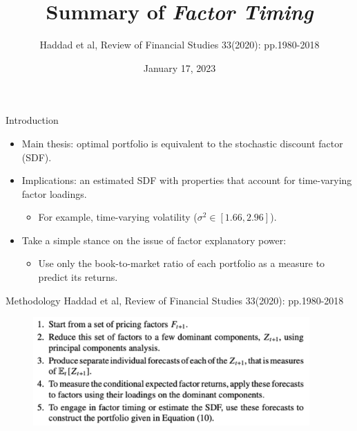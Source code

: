 \documentclass[dvipsnames,mathserif, handout]{beamer}
\begin{document}
\rightskip\rightmargin
\title{Summary of \textit{Factor Timing} }
\author{ Haddad et al, Review of Financial Studies 33(2020): pp.1980-2018 }
\footnotesize{\date{January 17, 2023 }


\begin{frame}[plain]
	\maketitle
\end{frame}

\begin{frame}{Introduction}
	\begin{itemize}
		\item Main thesis: optimal portfolio is equivalent to the stochastic discount factor (SDF).
		\item Implications: an estimated SDF with properties that account for time-varying factor loadings.
		\begin{itemize}
			\item For example, time-varying volatility ($\sigma^2 \in [1.66, 2.96]$).
		\end{itemize}
		\item Take a simple stance on the issue of factor explanatory power:
		\begin{itemize}
			\item Use only the book-to-market ratio of each portfolio as a measure to predict its returns.
		\end{itemize}
	\end{itemize}
\end{frame}

\begin{frame}{Methodology}
	Haddad et al, Review of Financial Studies 33(2020): pp.1980-2018 
	\begin{figure}[!ht]
		\includegraphics[width=300pt]{Steps.pdf}
	\end{figure}
\end{frame}

}
\end{document}
